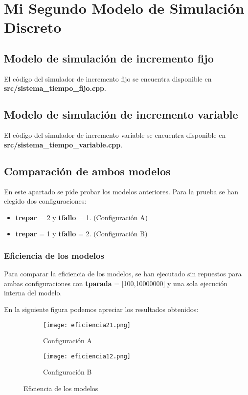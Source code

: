 \chapter{Mi Segundo Modelo de Simulación Discreto}

\section{Modelo de simulación de incremento fijo}
El código del simulador de incremento fijo se encuentra disponible en \textbf{src/sistema\_tiempo\_fijo.cpp}.

\section{Modelo de simulación de incremento variable}
El código del simulador de incremento variable se encuentra disponible en \textbf{src/sistema\_tiempo\_variable.cpp}.

\section{Comparación de ambos modelos}
En este apartado se pide probar los modelos anteriores. Para la prueba se han elegido dos configuraciones:
\begin{itemize}
	\item \textbf{trepar} = 2 y \textbf{tfallo} = 1. (Configuración A)
	\item \textbf{trepar} = 1 y \textbf{tfallo} = 2. (Configuración B)
\end{itemize}

\subsection{Eficiencia de los modelos}
Para comparar la eficiencia de los modelos, se han ejecutado sin repuestos para ambas configuraciones con \textbf{tparada} = [100,10000000] y una sola ejecución interna del modelo.

En la siguiente figura podemos apreciar los resultados obtenidos:

\begin{figure}[H]
	\centering
	\begin{subfigure}[b]{0.8\textwidth}
		\centering
		\texttt{[image: eficiencia21.png]}
		\caption{Configuración A}
	\end{subfigure}
	\hfill
	\begin{subfigure}[b]{0.8\textwidth}
		\centering
		\texttt{[image: eficiencia12.png]}
		\caption{Configuración B}
	\end{subfigure}
	\caption{Eficiencia de los modelos}
\end{figure}

